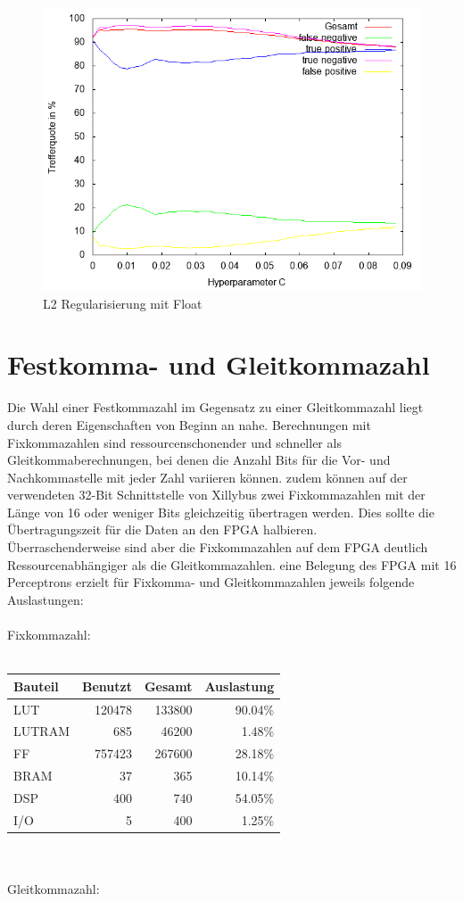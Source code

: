 \begin{figure}[ht]
\centering
\includegraphics[scale=.7]{bilder/pareto_l2_float}
\caption{L2 Regularisierung mit Float}
\end{figure}\newpage

\section{Festkomma- und Gleitkommazahl}
Die Wahl einer Festkommazahl im Gegensatz zu einer Gleitkommazahl liegt durch deren Eigenschaften von Beginn an nahe. Berechnungen mit Fixkommazahlen sind ressourcenschonender und schneller als Gleitkommaberechnungen, bei denen die Anzahl Bits für die Vor- und Nachkommastelle mit jeder Zahl variieren können. zudem können auf der verwendeten 32-Bit Schnittstelle von Xillybus zwei Fixkommazahlen mit der Länge von 16 oder weniger Bits gleichzeitig übertragen werden. Dies sollte die Übertragungszeit für die Daten an den FPGA halbieren. \\
Überraschenderweise sind aber die Fixkommazahlen auf dem FPGA deutlich Ressourcenabhängiger als die Gleitkommazahlen. eine Belegung des FPGA mit 16 Perceptrons erzielt für Fixkomma- und Gleitkommazahlen jeweils folgende Auslastungen:\\\\
Fixkommazahl:\\\\

\begin{tabularx}{.6\textwidth}{p{}|r|r|r}
Bauteil & Benutzt & Gesamt & Auslastung \\
\hline
LUT & 120478 & 133800 & 90.04\%\\
\hline
LUTRAM & 685 & 46200 & 1.48\%\\
\hline
FF & 757423 & 267600 & 28.18\%\\
\hline
BRAM & 37 & 365 & 10.14\%\\
\hline
DSP & 400 & 740 & 54.05\%\\
\hline
I/O & 5 & 400 & 1.25\%\\
\end{tabularx}\\\\
Gleitkommazahl:\\\\

